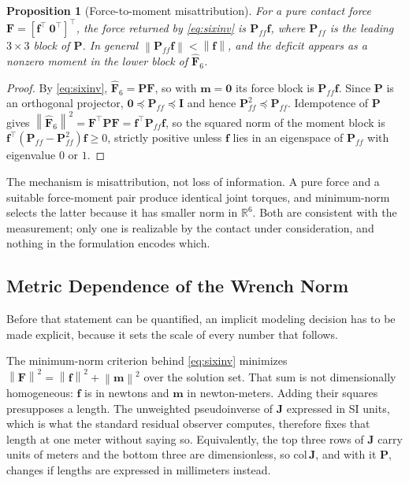 \documentclass{ieeeaccess}
\newtheorem{proposition}{Proposition}
\newcommand{\R}{\mathbb{R}}
\newcommand{\norm}[1]{\left\| #1 \right\|}
\newcommand{\Jfull}{\bm{J}}
\newcommand{\Pobs}{\bm{P}}
\newcommand{\Pff}{\bm{P}_{\!f\!f}}
\begin{document}
\begin{proposition}[Force-to-moment misattribution]
For a pure contact force $\bm F=[\bm f^{\!\top}\ \bm 0^{\!\top}]^{\!\top}$, the
force returned by \eqref{eq:sixinv} is $\Pff\bm f$, where $\Pff$ is the leading
$3\times3$ block of $\Pobs$. In general $\norm{\Pff\bm f}<\norm{\bm f}$, and the
deficit appears as a nonzero moment in the lower block of $\hat{\bm F}_{6}$.
\label{prop:split}
\end{proposition}

\begin{proof}
By \eqref{eq:sixinv}, $\hat{\bm F}_6=\Pobs\bm F$, so with $\bm m=\bm 0$ its force
block is $\Pff\bm f$. Since $\Pobs$ is an orthogonal projector,
$\bm 0\preceq\Pff\preceq\bm I$ and hence $\Pff^2\preceq\Pff$. Idempotence of
$\Pobs$ gives $\norm{\hat{\bm F}_6}^2=\bm F^{\!\top}\Pobs\bm F=
\bm f^{\!\top}\Pff\bm f$, so the squared norm of the moment block is
$\bm f^{\!\top}(\Pff-\Pff^2)\bm f\ge0$, strictly positive unless $\bm f$ lies in
an eigenspace of $\Pff$ with eigenvalue $0$ or $1$.
\end{proof}

The mechanism is misattribution, not loss of information. A pure force and a
suitable force-moment pair produce identical joint torques, and minimum-norm
selects the latter because it has smaller norm in $\R^6$. Both are
consistent with the measurement; only one is realizable by the contact under
consideration, and nothing in the formulation encodes which.

\subsection{Metric Dependence of the Wrench Norm}
\label{sec:metric}
Before that statement can be quantified, an implicit modeling decision has to be
made explicit, because it sets the scale of every number that follows.

The minimum-norm criterion behind \eqref{eq:sixinv} minimizes
$\norm{\bm F}^2=\norm{\bm f}^2+\norm{\bm m}^2$ over the solution set. That sum is
not dimensionally homogeneous: $\bm f$ is in newtons and $\bm m$ in
newton-meters. Adding their squares presupposes a length. The unweighted
pseudoinverse of $\Jfull$ expressed in SI units, which is what the standard
residual observer computes, therefore fixes that length at one meter without
saying so. Equivalently, the top three rows of $\Jfull$ carry units of meters and
the bottom three are dimensionless, so $\mathrm{col}\,\Jfull$, and with it
$\Pobs$, changes if lengths are expressed in millimeters instead.
\end{document}

